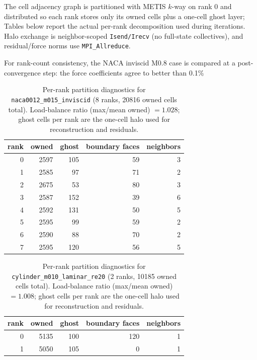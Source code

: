 The cell adjacency graph is partitioned with METIS $k$-way on rank 0 and distributed so each rank stores only its owned cells plus a one-cell ghost layer; Tables below report the actual per-rank decomposition used during iterations. Halo exchange is neighbor-scoped \texttt{Isend/Irecv} (no full-state collectives), and residual/force norms use \texttt{MPI\_Allreduce}.

For rank-count consistency, the NACA inviscid M0.8 case is compared at a post-convergence step: the force coefficients agree to better than 0.1\%%

\begin{table}[H]\centering\small
\begin{tabular}{rrrrr}\toprule
rank & owned & ghost & boundary faces & neighbors \\
\midrule
0 & 2597 & 105 & 59 & 3 \\
1 & 2585 & 97 & 71 & 2 \\
2 & 2675 & 53 & 80 & 3 \\
3 & 2587 & 152 & 39 & 6 \\
4 & 2592 & 131 & 50 & 5 \\
5 & 2595 & 99 & 59 & 2 \\
6 & 2590 & 88 & 70 & 2 \\
7 & 2595 & 120 & 56 & 5 \\
\bottomrule\end{tabular}
\caption{Per-rank partition diagnostics for \texttt{naca0012\_m015\_inviscid} (8 ranks, 20816 owned cells total). Load-balance ratio (max/mean owned) $=1.028$; ghost cells per rank are the one-cell halo used for reconstruction and residuals.}
\end{table}

\begin{table}[H]\centering\small
\begin{tabular}{rrrrr}\toprule
rank & owned & ghost & boundary faces & neighbors \\
\midrule
0 & 5135 & 100 & 120 & 1 \\
1 & 5050 & 105 & 0 & 1 \\
\bottomrule\end{tabular}
\caption{Per-rank partition diagnostics for \texttt{cylinder\_m010\_laminar\_re20} (2 ranks, 10185 owned cells total). Load-balance ratio (max/mean owned) $=1.008$; ghost cells per rank are the one-cell halo used for reconstruction and residuals.}
\end{table}

